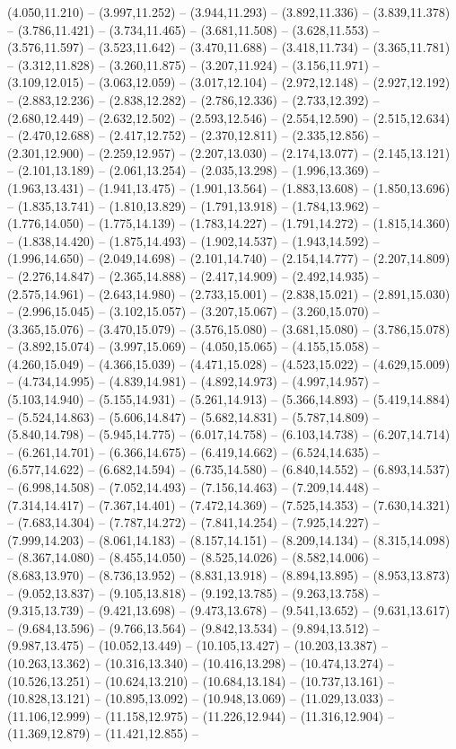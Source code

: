 (4.050,11.210) -- (3.997,11.252) -- (3.944,11.293) -- (3.892,11.336) -- (3.839,11.378) -- (3.786,11.421) -- (3.734,11.465) -- (3.681,11.508) -- (3.628,11.553) -- (3.576,11.597) -- (3.523,11.642) -- (3.470,11.688) -- (3.418,11.734) -- (3.365,11.781) -- (3.312,11.828) -- (3.260,11.875) -- (3.207,11.924) -- (3.156,11.971) -- (3.109,12.015) -- (3.063,12.059) -- (3.017,12.104) -- (2.972,12.148) -- (2.927,12.192) -- (2.883,12.236) -- (2.838,12.282) -- (2.786,12.336) -- (2.733,12.392) -- (2.680,12.449) -- (2.632,12.502) -- (2.593,12.546) -- (2.554,12.590) -- (2.515,12.634) -- (2.470,12.688) -- (2.417,12.752) -- (2.370,12.811) -- (2.335,12.856) -- (2.301,12.900) -- (2.259,12.957) -- (2.207,13.030) -- (2.174,13.077) -- (2.145,13.121) -- (2.101,13.189) -- (2.061,13.254) -- (2.035,13.298) -- (1.996,13.369) -- (1.963,13.431) -- (1.941,13.475) -- (1.901,13.564) -- (1.883,13.608) -- (1.850,13.696) -- (1.835,13.741) -- (1.810,13.829) -- (1.791,13.918) -- (1.784,13.962) -- (1.776,14.050) -- (1.775,14.139) -- (1.783,14.227) -- (1.791,14.272) -- (1.815,14.360) -- (1.838,14.420) -- (1.875,14.493) -- (1.902,14.537) -- (1.943,14.592) -- (1.996,14.650) -- (2.049,14.698) -- (2.101,14.740) -- (2.154,14.777) -- (2.207,14.809) -- (2.276,14.847) -- (2.365,14.888) -- (2.417,14.909) -- (2.492,14.935) -- (2.575,14.961) -- (2.643,14.980) -- (2.733,15.001) -- (2.838,15.021) -- (2.891,15.030) -- (2.996,15.045) -- (3.102,15.057) -- (3.207,15.067) -- (3.260,15.070) -- (3.365,15.076) -- (3.470,15.079) -- (3.576,15.080) -- (3.681,15.080) -- (3.786,15.078) -- (3.892,15.074) -- (3.997,15.069) -- (4.050,15.065) -- (4.155,15.058) -- (4.260,15.049) -- (4.366,15.039) -- (4.471,15.028) -- (4.523,15.022) -- (4.629,15.009) -- (4.734,14.995) -- (4.839,14.981) -- (4.892,14.973) -- (4.997,14.957) -- (5.103,14.940) -- (5.155,14.931) -- (5.261,14.913) -- (5.366,14.893) -- (5.419,14.884) -- (5.524,14.863) -- (5.606,14.847) -- (5.682,14.831) -- (5.787,14.809) -- (5.840,14.798) -- (5.945,14.775) -- (6.017,14.758) -- (6.103,14.738) -- (6.207,14.714) -- (6.261,14.701) -- (6.366,14.675) -- (6.419,14.662) -- (6.524,14.635) -- (6.577,14.622) -- (6.682,14.594) -- (6.735,14.580) -- (6.840,14.552) -- (6.893,14.537) -- (6.998,14.508) -- (7.052,14.493) -- (7.156,14.463) -- (7.209,14.448) -- (7.314,14.417) -- (7.367,14.401) -- (7.472,14.369) -- (7.525,14.353) -- (7.630,14.321) -- (7.683,14.304) -- (7.787,14.272) -- (7.841,14.254) -- (7.925,14.227) -- (7.999,14.203) -- (8.061,14.183) -- (8.157,14.151) -- (8.209,14.134) -- (8.315,14.098) -- (8.367,14.080) -- (8.455,14.050) -- (8.525,14.026) -- (8.582,14.006) -- (8.683,13.970) -- (8.736,13.952) -- (8.831,13.918) -- (8.894,13.895) -- (8.953,13.873) -- (9.052,13.837) -- (9.105,13.818) -- (9.192,13.785) -- (9.263,13.758) -- (9.315,13.739) -- (9.421,13.698) -- (9.473,13.678) -- (9.541,13.652) -- (9.631,13.617) -- (9.684,13.596) -- (9.766,13.564) -- (9.842,13.534) -- (9.894,13.512) -- (9.987,13.475) -- (10.052,13.449) -- (10.105,13.427) -- (10.203,13.387) -- (10.263,13.362) -- (10.316,13.340) -- (10.416,13.298) -- (10.474,13.274) -- (10.526,13.251) -- (10.624,13.210) -- (10.684,13.184) -- (10.737,13.161) -- (10.828,13.121) -- (10.895,13.092) -- (10.948,13.069) -- (11.029,13.033) -- (11.106,12.999) -- (11.158,12.975) -- (11.226,12.944) -- (11.316,12.904) -- (11.369,12.879) -- (11.421,12.855) -- 